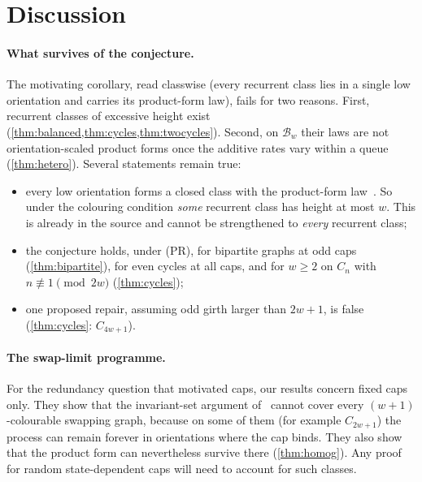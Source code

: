 \documentclass[11pt,a4paper]{article}
\theoremstyle{plain}
\theoremstyle{plain}
\newcommand{\Bal}{\mathcal{B}}
\begin{document}
\section{Discussion}\label{sec:discussion}

\paragraph{What survives of the conjecture.} The motivating corollary, read classwise (every recurrent class lies in a single low orientation and carries its product-form law), fails for two reasons. First, recurrent classes of excessive height exist (\cref{thm:balanced,thm:cycles,thm:twocycles}). Second, on $\Bal_w$ their laws are not orientation-scaled product forms once the additive rates vary within a queue (\cref{thm:hetero}). Several statements remain true:
\begin{itemize}
\item every low orientation forms a closed class with the product-form law~\cite[Theorem~7]{DG2024}. So under the colouring condition \emph{some} recurrent class has height at most $w$. This is already in the source and cannot be strengthened to \emph{every} recurrent class;
\item the conjecture holds, under (PR), for bipartite graphs at odd caps (\cref{thm:bipartite}), for even cycles at all caps, and for $w\ge2$ on $C_n$ with $n\not\equiv1\pmod{2w}$ (\cref{thm:cycles});
\item one proposed repair, assuming odd girth larger than $2w+1$, is false (\cref{thm:cycles}: $C_{4w+1}$).
\end{itemize}

\paragraph{The swap-limit programme.} For the redundancy question that motivated caps, our results concern fixed caps only. They show that the invariant-set argument of~\cite{DG2024} cannot cover every $(w+1)$-colourable swapping graph, because on some of them (for example $C_{2w+1}$) the process can remain forever in orientations where the cap binds. They also show that the product form can nevertheless survive there (\cref{thm:homog}). Any proof for random state-dependent caps will need to account for such classes.
\end{document}
